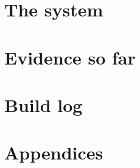 \documentclass[11pt,openright]{scrbook}
\begin{document}
\part{The system}




\part{Evidence so far}


\part{Build log}


\appendix
\part{Appendices}





\backmatter


\end{document}
